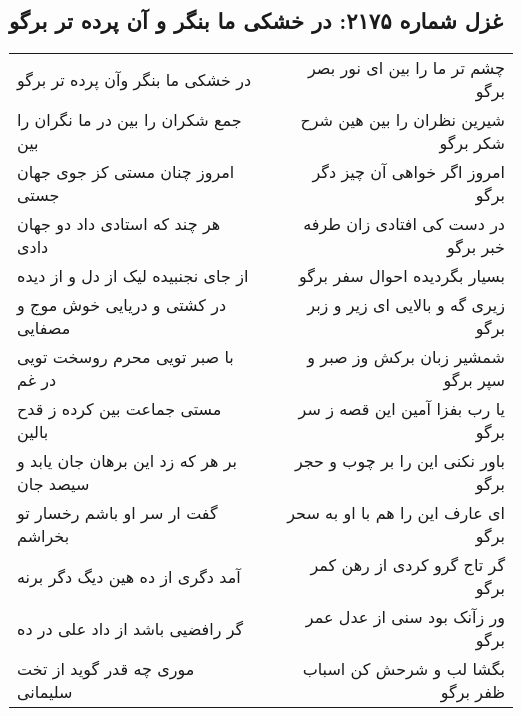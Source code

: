 \begin{center}
\section*{غزل شماره ۲۱۷۵: در خشکی ما بنگر و آن پرده تر برگو}
\label{sec:2175}
\begin{longtable}{l p{0.5cm} r}
در خشکی ما بنگر وآن پرده تر برگو
&&
چشم تر ما را بین ای نور بصر برگو
\\
جمع شکران را بین در ما نگران را بین
&&
شیرین نظران را بین هین شرح شکر برگو
\\
امروز چنان مستی کز جوی جهان جستی
&&
امروز اگر خواهی آن چیز دگر برگو
\\
هر چند که استادی داد دو جهان دادی
&&
در دست کی افتادی زان طرفه خبر برگو
\\
از جای نجنبیده لیک از دل و از دیده
&&
بسیار بگردیده احوال سفر برگو
\\
در کشتی و دریایی خوش موج و مصفایی
&&
زیری گه و بالایی ای زیر و زبر برگو
\\
با صبر تویی محرم روسخت تویی در غم
&&
شمشیر زبان برکش وز صبر و سپر برگو
\\
مستی جماعت بین کرده ز قدح بالین
&&
یا رب بفزا آمین این قصه ز سر برگو
\\
بر هر که زد این برهان جان یابد و سیصد جان
&&
باور نکنی این را بر چوب و حجر برگو
\\
گفت ار سر او باشم رخسار تو بخراشم
&&
ای عارف این را هم با او به سحر برگو
\\
آمد دگری از ده هین دیگ دگر برنه
&&
گر تاج گرو کردی از رهن کمر برگو
\\
گر رافضیی باشد از داد علی در ده
&&
ور زآنک بود سنی از عدل عمر برگو
\\
موری چه قدر گوید از تخت سلیمانی
&&
بگشا لب و شرحش کن اسباب ظفر برگو
\\
\end{longtable}
\end{center}
